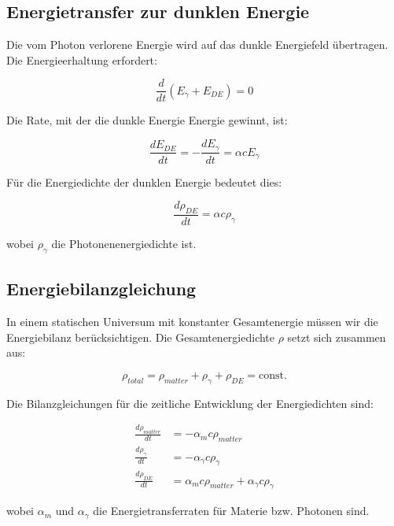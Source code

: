 \documentclass[a4paper,12pt]{article}
\theoremstyle{definition}
\theoremstyle{remark}
\begin{document}
	\subsection{Energietransfer zur dunklen Energie}
	Die vom Photon verlorene Energie wird auf das dunkle Energiefeld übertragen. Die Energieerhaltung erfordert:
	
	\begin{equation}
		\frac{d}{dt}(E_{\gamma} + E_{DE}) = 0
	\end{equation}
	
	Die Rate, mit der die dunkle Energie Energie gewinnt, ist:
	
	\begin{equation}
		\frac{dE_{DE}}{dt} = -\frac{dE_{\gamma}}{dt} = \alpha c E_{\gamma}
	\end{equation}
	
	Für die Energiedichte der dunklen Energie bedeutet dies:
	
	\begin{equation}
		\frac{d\rho_{DE}}{dt} = \alpha c \rho_{\gamma}
	\end{equation}
	
	wobei $\rho_{\gamma}$ die Photonenenergiedichte ist.
	
	\subsection{Energiebilanzgleichung}
	In einem statischen Universum mit konstanter Gesamtenergie müssen wir die Energiebilanz berücksichtigen. Die Gesamtenergiedichte $\rho$ setzt sich zusammen aus:
	
	\begin{equation}
		\rho_{total} = \rho_{matter} + \rho_{\gamma} + \rho_{DE} = \text{const.}
	\end{equation}
	
	Die Bilanzgleichungen für die zeitliche Entwicklung der Energiedichten sind:
	
	\begin{align}
		\frac{d\rho_{matter}}{dt} &= -\alpha_{m} c \rho_{matter} \\
		\frac{d\rho_{\gamma}}{dt} &= -\alpha_{\gamma} c \rho_{\gamma} \\
		\frac{d\rho_{DE}}{dt} &= \alpha_{m} c \rho_{matter} + \alpha_{\gamma} c \rho_{\gamma}
	\end{align}
	
	wobei $\alpha_{m}$ und $\alpha_{\gamma}$ die Energietransferraten für Materie bzw. Photonen sind.
	
\end{document}
